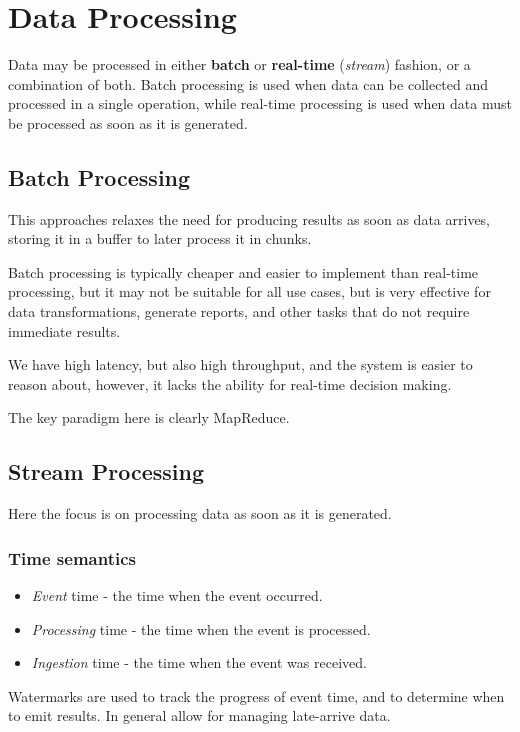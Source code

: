 \chapter{Data Processing}

Data may be processed in either \textbf{batch} or \textbf{real-time} (\textit{stream}) fashion, or a combination of both. Batch processing is used when data can be collected and processed in a single operation, while real-time processing is used when data must be processed as soon as it is generated.

\section{Batch Processing}
This approaches relaxes the need for producing results as soon as data arrives, storing it in a buffer to later process it in chunks.

Batch processing is typically cheaper and easier to implement than real-time processing, but it may not be suitable for all use cases, but is very effective for data transformations, generate reports, and other tasks that do not require immediate results.

We have high latency, but also high throughput, and the system is easier to reason about, however, it lacks the ability for real-time decision making.

The key paradigm here is clearly MapReduce.

\section{Stream Processing}

Here the focus is on processing data as soon as it is generated.

\subsection{Time semantics}
\begin{itemize}
   \item \textit{Event} time - the time when the event occurred.
   \item \textit{Processing} time - the time when the event is processed. 
   \item \textit{Ingestion} time - the time when the event was received. 
\end{itemize}

Watermarks are used to track the progress of event time, and to determine when to emit results. In general allow for managing late-arrive data.

